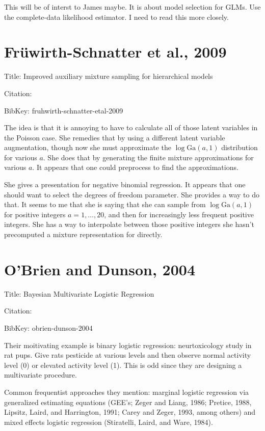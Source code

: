 \documentclass{article}
\newcommand{\qt}{}
\begin{document}
This will be of interst to James maybe.  It is about model selection for GLMs.
Use the complete-data likelihood estimator.  I need to read this more closely.

\section{Fr\"{u}wirth-Schnatter et al., 2009}

Title: Improved auxiliary mixture sampling for hierarchical models

Citation: \cite{fruhwirth-schnatter-etal-2009}

BibKey: fruhwirth-schnatter-etal-2009

The idea is that it is annoying to have to calculate all of those latent
variables in the Poisson case.  She remedies that by using a different latent
variable augmentation, though now she must approximate the $\log \text{Ga}(a,
1)$ distribution for various $a$.  She does that by generating the finite
mixture approximations for various $a$.  It appears that one could preprocess to
find the approximations.

She gives a presentation for negative binomial regression.  It appears that one
should want to select the degrees of freedom parameter.  She provides a way to
do that.  It seems to me that she is saying that she can sample from $\log
\text{Ga}(a, 1)$ for positive integers $a=1, \ldots, 20$, and then for
increasingly less frequent positive integers.  She has a way to interpolate
between those positive integers she hasn't precomputed a mixture representation
for directly.

\section{O'Brien and Dunson, 2004}

Title: Bayesian Multivariate Logistic Regression

Citation: \cite{obrien-dunson-2004}

BibKey: obrien-dunson-2004

Their moitivating example is binary logistic regression: neurtoxicology study in
rat pups.  Give rats pesticide at various levels and then observe normal
activity level (0) or elevated activity level (1).  This is odd since they are
designing a multivariate procedure.

Common frequentist approaches they mention: marginal logistic regression via
generalized estimating equations \qt{(GEE's; Zeger and Liang, 1986; Pretice, 1988,
Lipsitz, Laird, and Harrington, 1991; Carey and Zeger, 1993, among others) and
mixed effects logistic regression (Stiratelli, Laird, and Ware, 1984).}
\end{document}
